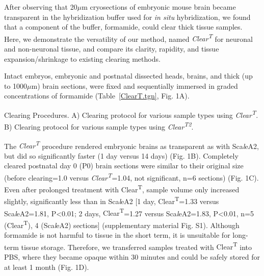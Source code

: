 After observing that 20$\mu$m cryosections of embryonic mouse brain became transparent in the hybridization buffer used for \emph{in situ} hybridization, we found that a component of the buffer, formamide, could clear thick tissue samples.
Here, we demonstrate the versatility of our method, named \emph{Clear\textsuperscript{T}} for neuronal and non-neuronal tissue, and compare its clarity, rapidity, and tissue expansion/shrinkage to existing clearing methods.

Intact embryos, embryonic and postnatal dissected heads, brains, and thick (up to 1000$\mu$m) brain sections, were fixed and sequentially immersed in graded concentrations of formamide (Table~\ref{ClearT.tgn}, Fig. 1A).
\begin{table}[hbtp]
    \begin{center}
        \caption[Clearing Procedures.]
        {Clearing Procedures.
		A) Clearing protocol for various sample types using \emph{Clear\textsuperscript{T}}.
		B) Clearing protocol for various sample types using \emph{Clear\textsuperscript{T2}}.
		}
        \label{ClearT.tgn}
    \end{center}
\end{table}
The \emph{Clear\textsuperscript{T}} procedure rendered embryonic brains as transparent as with Sca\emph{l}eA2, but did so significantly faster (1 day versus 14 days) (Fig. 1B).
Completely cleared postnatal day 0 (P0) brain sections were similar to their original size (before clearing=1.0 versus \emph{Clear\textsuperscript{T}}=1.04, not significant, n=6 sections) (Fig. 1C).
Even after prolonged treatment with {Clear\textsuperscript{T}}, sample volume only increased slightly, significantly less than in Sca\emph{l}eA2 [1 day, {Clear\textsuperscript{T}}=1.33 versus Sca\emph{l}eA2=1.81, P<0.01; 2 days, {Clear\textsuperscript{T}}=1.27 versus Sca\emph{l}eA2=1.83, P<0.01, n=5 ({Clear\textsuperscript{T}}), 4 (Sca\emph{l}eA2) sections] (supplementary material Fig. S1).
Although formamide is not harmful to tissue in the short term, it is unsuitable for long-term tissue storage.
Therefore, we transferred samples treated with {Clear\textsuperscript{T}} into PBS, where they became opaque within 30 minutes and could be safely stored for at least 1 month (Fig. 1D).
